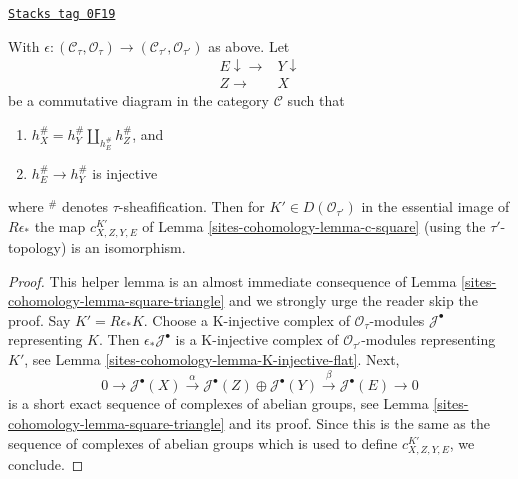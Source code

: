 \begin{lemma}
\label{sites-cohomology-lemma-descent-squares-helper}
\href{https://stacks.math.columbia.edu/tag/0F19}{\texttt{Stacks tag 0F19}}

With $\epsilon : (\mathcal{C}_\tau, \mathcal{O}_\tau) \to
(\mathcal{C}_{\tau'}, \mathcal{O}_{\tau'})$ as above. Let
$$
\begin{array}{cc}E \downarrow\longrightarrow & Y \downarrow \\ Z \longrightarrow & X\end{array}
$$
be a commutative diagram in the category $\mathcal{C}$ such that
\begin{enumerate}
\item $h_X^\# = h_Y^\# \amalg_{h_E^\#} h_Z^\#$, and
\item $h_E^\# \to h_Y^\#$ is injective
\end{enumerate}
where ${}^\#$ denotes $\tau$-sheafification. Then for
$K' \in D(\mathcal{O}_{\tau'})$ in the essential image of
$R\epsilon_*$ the map $c^{K'}_{X, Z, Y, E}$ of Lemma \ref{sites-cohomology-lemma-c-square}
(using the $\tau'$-topology) is an isomorphism.
\end{lemma}

\begin{proof}
This helper lemma is an almost immediate consequence of
Lemma \ref{sites-cohomology-lemma-square-triangle}
and we strongly urge the reader skip the proof.
Say $K' = R\epsilon_*K$. Choose a K-injective complex of
$\mathcal{O}_\tau$-modules $\mathcal{J}^\bullet$ representing $K$.
Then $\epsilon_*\mathcal{J}^\bullet$ is a K-injective complex of
$\mathcal{O}_{\tau'}$-modules representing $K'$, see
Lemma \ref{sites-cohomology-lemma-K-injective-flat}. Next,
$$
0 \to
\mathcal{J}^\bullet(X) \xrightarrow{\alpha}
\mathcal{J}^\bullet(Z) \oplus
\mathcal{J}^\bullet(Y) \xrightarrow{\beta}
\mathcal{J}^\bullet(E)
\to 0
$$
is a short exact sequence of complexes of abelian groups, see
Lemma \ref{sites-cohomology-lemma-square-triangle} and its proof.
Since this is the same as the sequence of complexes of abelian
groups which is used to define $c^{K'}_{X, Z, Y, E}$, we conclude.
\end{proof}

